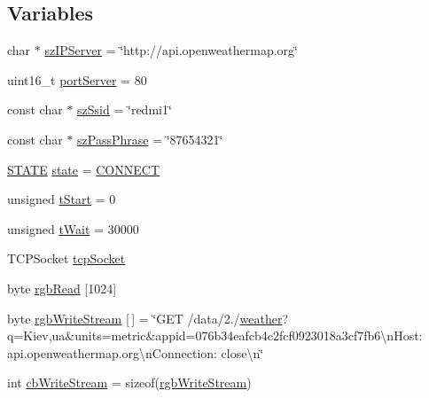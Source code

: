\subsection*{Variables}
\begin{DoxyCompactItemize}
\item 
char $\ast$ \hyperlink{_weather__monitor_8ino_ab86a403a2a104e7fabbc34f3116ed1d4}{sz\+I\+P\+Server} = \char`\"{}http\+://api.\+openweathermap.\+org\char`\"{}
\item 
uint16\+\_\+t \hyperlink{_weather__monitor_8ino_a88e932baaa40e28779d94f226f5948a0}{port\+Server} = 80
\item 
const char $\ast$ \hyperlink{_weather__monitor_8ino_a6d4a0a4278dcba2bd3f1a41ebf5157a5}{sz\+Ssid} = \char`\"{}redmi1\char`\"{}
\item 
const char $\ast$ \hyperlink{_weather__monitor_8ino_a498a9cc5754dacf2e488cddd337a5f4f}{sz\+Pass\+Phrase} = \char`\"{}87654321\char`\"{}
\item 
\hyperlink{_weather__monitor_8ino_a275a67132f10277ada3a0ee3d616b647}{S\+T\+A\+TE} \hyperlink{_weather__monitor_8ino_a390ef51e2cfd455504254347218a71ca}{state} = \hyperlink{_weather__monitor_8ino_a275a67132f10277ada3a0ee3d616b647a20391dd2915a0e64343d24c2f2e40b95}{C\+O\+N\+N\+E\+CT}
\item 
unsigned \hyperlink{_weather__monitor_8ino_adb18b6f6efb06ceb6d55a33e9238f58c}{t\+Start} = 0
\item 
unsigned \hyperlink{_weather__monitor_8ino_a13e5b20be560ae81e73077e2e6c060dd}{t\+Wait} = 30000
\item 
T\+C\+P\+Socket \hyperlink{_weather__monitor_8ino_a04eefc95dcf761d8a956d1b0d9c25226}{tcp\+Socket}
\item 
byte \hyperlink{_weather__monitor_8ino_a1703b63154dd86de08d67defb88863c0}{rgb\+Read} \mbox{[}1024\mbox{]}
\item 
byte \hyperlink{_weather__monitor_8ino_a0990cd80a9c34e96dafbc001af446b06}{rgb\+Write\+Stream} \mbox{[}$\,$\mbox{]} = \char`\"{}G\+ET /data/2./\hyperlink{_weather__monitor_8ino_a3f5ff30909a7914cb8eb33a054f67722}{weather}?q=Kiev,ua\&units=metric\&appid=076b34eafcb4c2fcf0923018a3cf7fb6\textbackslash{}n\+Host\+: api.\+openweathermap.\+org\textbackslash{}n\+Connection\+: close\textbackslash{}n\char`\"{}
\item 
int \hyperlink{_weather__monitor_8ino_acbdcae1943d12f8baa3ea151e6028b65}{cb\+Write\+Stream} = sizeof(\hyperlink{_weather__monitor_8ino_a0990cd80a9c34e96dafbc001af446b06}{rgb\+Write\+Stream})
\item 

\end{DoxyCompactItemize}
